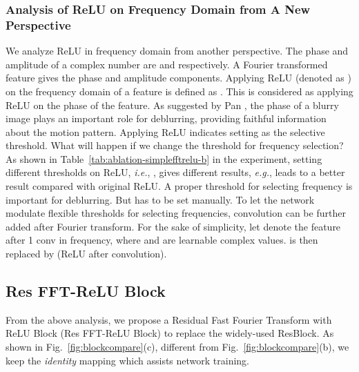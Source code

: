 \documentclass[letterpaper]{article} \usepackage{aaai23}  \usepackage{times}  \usepackage{helvet}  \usepackage{courier}  \usepackage[hyphens]{url}  \usepackage{graphicx} \usepackage{enumitem}
\begin{document}
\subsubsection{Analysis of ReLU on Frequency Domain from A New Perspective}
We analyze ReLU in frequency domain from another perspective. The phase and amplitude of a complex number  are  and  respectively. A Fourier transformed feature gives the phase and amplitude components. Applying ReLU (denoted as ) on the frequency domain of a feature is defined as . This is considered as applying ReLU on the phase of the feature. As suggested by Pan \cite{Pan2019phase}, the phase of a blurry image plays an important role for deblurring, providing faithful information about the motion pattern. Applying ReLU indicates setting  as the selective threshold. What will happen if we change the threshold for frequency selection? As shown in Table~\ref{tab:ablation-simplefftrelu-b} in the experiment, setting different thresholds on ReLU, \emph{i.e.}, , gives different results, \emph{e.g.},  leads to a better result compared with original ReLU. A proper threshold for selecting frequency is important for deblurring. But  has to be set manually. To let the network modulate flexible thresholds for selecting frequencies, convolution can be further added after Fourier transform. For the sake of simplicity, let  denote the feature after 1 conv in frequency, where  and  are learnable complex values.  is then replaced by  (ReLU after convolution).

\subsection{Res FFT-ReLU Block}
\label{sec:newblock}
From the above analysis, we propose a Residual Fast Fourier Transform with ReLU {Block} (Res FFT-ReLU Block) to replace the widely-used ResBlock. As shown in Fig.~\ref{fig:blockcompare}(c), different from Fig.~\ref{fig:blockcompare}(b), we keep the \emph{identity} mapping which assists network training. 
\end{document}

